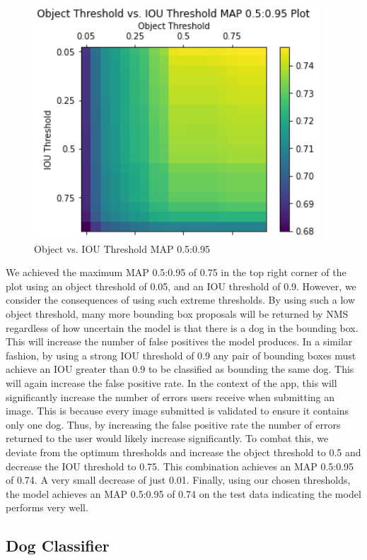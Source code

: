 \documentclass{article}
\begin{document}
\begin{figure}[h]
\centering
	\includegraphics[scale=0.7]{final-report-images/map0.5to0.95.png}
\caption{Object vs. IOU Threshold MAP 0.5:0.95}
\label{fig:x object v iou}
\end{figure}

\noindent We achieved the maximum MAP 0.5:0.95 of 0.75 in the top right corner of the plot using an object threshold of 0.05, and an IOU threshold of 0.9.  However, we consider the consequences of using such extreme thresholds.  By using such a low object threshold, many more bounding box proposals will be returned by NMS regardless of how uncertain the model is that there is a dog in the bounding box.  This will increase the number of false positives the model produces.  In a similar fashion, by using a strong IOU threshold of 0.9 any pair of bounding boxes must achieve an IOU greater than 0.9 to be classified as bounding the same dog.  This will again increase the false positive rate.  In the context of the app, this will significantly increase the number of errors users receive when submitting an image.  This is because every image submitted is validated to ensure it contains only one dog.  Thus, by increasing the false positive rate the number of errors returned to the user would likely increase significantly.  To combat this, we deviate from the optimum thresholds and increase the object threshold to 0.5 and decrease the IOU threshold to 0.75.  This combination achieves an MAP 0.5:0.95 of 0.74.  A very small decrease of just 0.01.  Finally, using our chosen thresholds, the model achieves an MAP 0.5:0.95 of 0.74 on the test data indicating the model performs very well.

\subsection{Dog Classifier}
\end{document}
